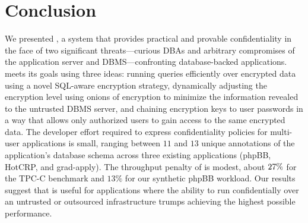 \section{Conclusion}
\label{s:concl}

We presented \name{}, a system that provides practical and provable
confidentiality in the face of two significant threats---curious DBAs
and arbitrary compromises of the application server and
DBMS---confronting database-backed applications.  \name{} meets its
goals using three ideas: running queries efficiently over encrypted
data using a novel SQL-aware encryption strategy, dynamically
adjusting the encryption level using onions of encryption to minimize
the information revealed to the untrusted DBMS server, and chaining
encryption keys to user passwords in a way that allows only authorized
users to gain access to the same encrypted data.  The developer effort
required to express confidentiality policies for multi-user
applications is small, ranging between $11$ and $13$ unique
annotations of the application's database schema across three existing
applications (phpBB, HotCRP, and grad-apply).  The throughput penalty
of \name{} is modest, about $27\%$ for the TPC-C benchmark and $13\%$
for our synthetic phpBB workload.  Our results suggest that \name{} is
useful for applications where the ability to run confidentially over
an untrusted or outsourced infrastructure trumps achieving the highest
possible performance.


